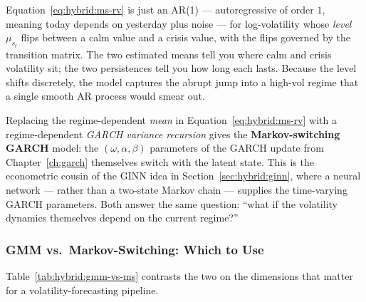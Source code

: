 \begin{intuition}
Equation~\eqref{eq:hybrid:ms-rv} is just an AR(1) --- autoregressive of
order $1$, meaning today depends on yesterday plus noise --- for
log-volatility whose
\emph{level} $\mu_{s_t}$ flips between a calm value and a crisis value, with
the flips governed by the transition matrix.  The two estimated means tell
you where calm and crisis volatility sit; the two persistences tell you how
long each lasts.  Because the level shifts discretely, the model captures
the abrupt jump into a high-vol regime that a single smooth AR process
would smear out.
\end{intuition}

\begin{projectconnection}
Replacing the regime-dependent \emph{mean} in
Equation~\eqref{eq:hybrid:ms-rv} with a regime-dependent \emph{GARCH
variance recursion} gives the \textbf{Markov-switching GARCH} model: the
$(\omega, \alpha, \beta)$ parameters of the GARCH update from
Chapter~\ref{ch:garch} themselves switch with the latent state.  This is
the econometric cousin of the GINN idea in
Section~\ref{sec:hybrid:ginn}, where a neural network --- rather than a
two-state Markov chain --- supplies the time-varying GARCH parameters.
Both answer the same question: ``what if the volatility dynamics
themselves depend on the current regime?''
\end{projectconnection}

\subsubsection{GMM vs.\ Markov-Switching: Which to Use}
\label{sec:hybrid:gmm-vs-ms}

Table~\ref{tab:hybrid:gmm-vs-ms} contrasts the two on the dimensions that
matter for a volatility-forecasting pipeline.

